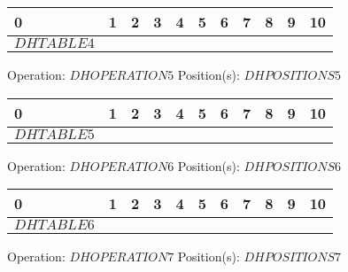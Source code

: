 {{        \begin{center}
            \begin{tabular}{|P{0.75cm}|P{0.75cm}|P{0.75cm}|P{0.75cm}|P{0.75cm}|P{0.75cm}|P{0.75cm}|P{0.75cm}|P{0.75cm}|P{0.75cm}|P{0.75cm}|}
                 & 1 & 2 & 3 & 4 & 5 & 6 & 7 & 8 & 9 & 10  \\
                \hline
                $DHTABLE4$&&&&&&&&&& \\
                \hline
            \end{tabular}
        \end{center}Operation: \underline{\color{tumgadRed}$DHOPERATION5$} \hspace{10px} Position(s): \underline{\color{tumgadRed}$DHPOSITIONS5$}
        \begin{center}
            \begin{tabular}{|P{0.75cm}|P{0.75cm}|P{0.75cm}|P{0.75cm}|P{0.75cm}|P{0.75cm}|P{0.75cm}|P{0.75cm}|P{0.75cm}|P{0.75cm}|P{0.75cm}|}
                 & 1 & 2 & 3 & 4 & 5 & 6 & 7 & 8 & 9 & 10  \\
                \hline
                $DHTABLE5$&&&&&&&&&& \\
                \hline
            \end{tabular}
        \end{center}Operation: \underline{\color{tumgadRed}$DHOPERATION6$} \hspace{10px} Position(s): \underline{\color{tumgadRed}$DHPOSITIONS6$}
        \begin{center}
            \begin{tabular}{|P{0.75cm}|P{0.75cm}|P{0.75cm}|P{0.75cm}|P{0.75cm}|P{0.75cm}|P{0.75cm}|P{0.75cm}|P{0.75cm}|P{0.75cm}|P{0.75cm}|}
                 & 1 & 2 & 3 & 4 & 5 & 6 & 7 & 8 & 9 & 10  \\
                \hline
                $DHTABLE6$&&&&&&&&&& \\
                \hline
            \end{tabular}
        \end{center}Operation: \underline{\color{tumgadRed}$DHOPERATION7$} \hspace{10px} Position(s): \underline{\color{tumgadRed}$DHPOSITIONS7$}
        \begin{center}
            \begin{tabular}{|P{0.75cm}|P{0.75cm}|P{0.75cm}|P{0.75cm}|P{0.75cm}|P{0.75cm}|P{0.75cm}|P{0.75cm}|P{0.75cm}|P{0.75cm}|P{0.75cm}|}

\end{tabular}
\end{center}}}
